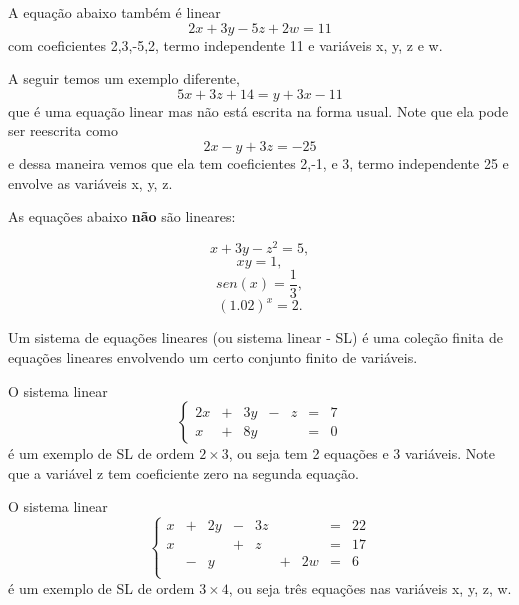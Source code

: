 \begin{ex}
A equação abaixo também é linear
\[
2x+3y-5z+2w=11
\]
com coeficientes 2,3,-5,2, termo independente 11 e variáveis x, y, z e w.
\end{ex}

\begin{ex}
A seguir temos um exemplo diferente,
\[
5x+3z+14=y+3x-11
\] que é uma equação linear mas não está escrita na forma usual. Note que ela pode ser reescrita como
\[
2x-y+3z=-25
\]
e dessa maneira vemos que ela tem coeficientes 2,-1, e 3,  termo independente 25 e envolve as variáveis x, y, z.
\end{ex}

\begin{ex} As equações abaixo {\bf não} são lineares:

\[x+3y-z^2=5,\]
\[xy = 1,\]
\[sen(x)=\frac{1}{3}, \]
\[(1.02)^x=2.\]
\end{ex}

\begin{defn} Um sistema de equações lineares (ou sistema linear - SL) é uma coleção finita de equações lineares envolvendo um certo conjunto finito de  variáveis.
\end{defn}

\begin{ex}
O sistema linear
\begin{equation*}
\left\{
\begin{array}{ccccccc}
2x&+&3y&-&z&=&7 \\
x&+&8y& & &=&0
\end{array}
\right.
\end{equation*}
é um exemplo de SL de ordem $2 \times 3$, ou seja tem 2 equações e 3 variáveis. Note que a variável z tem coeficiente zero na segunda equação.
\end{ex}


\begin{ex}
O sistema linear
\begin{equation*}
\left\{
\begin{array}{ccccccccc}
x&+&2y&-&3z& & &=&22 \\
x& &  &+&z & & &=&17 \\
&-&y & &  &+&2w&=&6 \\
\end{array}
\right.
\end{equation*}
é um exemplo de SL de ordem $3 \times 4$, ou seja três equações nas variáveis x, y, z, w.
\end{ex}


